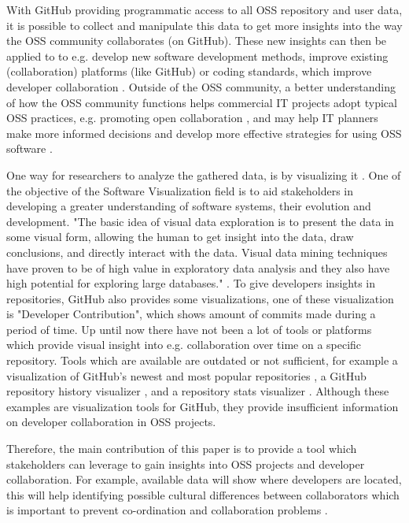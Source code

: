 \documentclass[acmtog, authorversion]{acmart}
\begin{document}
With GitHub providing programmatic access to all OSS repository and user data\cite{GHAPI}, it is possible to collect and manipulate this data to get more insights into the way the OSS community collaborates (on GitHub).
These new insights can then be applied to to e.g. develop new software development methods, improve existing (collaboration) platforms (like GitHub) or coding standards, which improve developer collaboration \cite{Jermakovics2013}.
Outside of the OSS community, a better understanding of how the OSS community functions helps commercial IT projects adopt typical OSS practices, e.g. promoting open collaboration \cite{Kalliamvakou:2015:OSC:2818754.2818825}, and may help IT planners make more informed decisions and develop more effective strategies for using OSS software \cite{madey2002}.

One way for researchers to analyze the gathered data, is by visualizing it \cite{Heller}.
One of the objective of the Software Visualization field is to aid stakeholders in developing a greater understanding of software systems, their evolution and development.
"The basic idea of visual data exploration is to present the data in some visual form, allowing the human to get insight into the data, draw conclusions, and directly interact with the data.
Visual data mining techniques have proven to be of high value in exploratory data analysis and they also have high potential for exploring large databases." \cite{981847}.
To give developers insights in repositories, GitHub also provides some visualizations, one of these visualization is "Developer Contribution", which shows amount of commits made during a period of time.
Up until now there have not been a lot of tools or platforms which provide visual insight into e.g. collaboration over time on a specific repository.
Tools which are available are outdated \cite{Heller} or not sufficient, for example a visualization of GitHub's newest and most popular repositories \cite{donnemartin2016}, a GitHub repository history visualizer \cite{artzub2013}, and a repository stats visualizer \cite{bajaj2013}.
Although these examples are visualization tools for GitHub, they provide insufficient information on developer collaboration in OSS projects.

Therefore, the main contribution of this paper is to provide a tool which stakeholders can leverage to gain insights into OSS projects and developer collaboration.
For example, available data will show where developers are located, this will help identifying possible cultural differences between collaborators which is important to prevent co-ordination and collaboration problems \cite{Mishra2014}.
\end{document}
